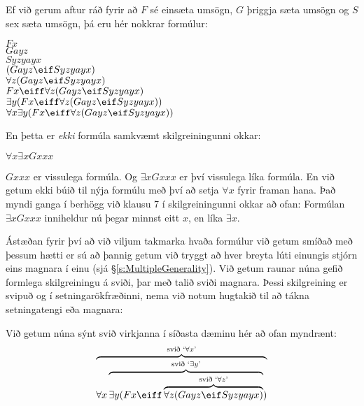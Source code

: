 Ef við gerum aftur ráð fyrir að $F$ sé einsæta umsögn, $G$ þriggja sæta umsögn og $S$ sex sæta umsögn, þá eru hér nokkrar formúlur:
	\begin{center}
		$Fx$\\
		$Gayz$\\
		$Syzyayx$\\
		$(Gayz \eif Syzyayx)$\\
		$\forall z (Gayz \eif Syzyayx)$\\
		$Fx \eiff \forall z (Gayz \eif Syzyayx)$\\
		$\exists y (Fx \eiff \forall z (Gayz \eif Syzyayx))$\\
		$\forall x \exists y (Fx \eiff \forall z (Gayz \eif Syzyayx))$		\end{center}
En þetta er \emph{ekki} formúla samkvæmt skilgreiningunni okkar:		
	\begin{center}
		$\forall x \exists x Gxxx$
	\end{center}
$Gxxx$ er vissulega formúla. Og $\exists x Gxxx$ er því vissulega líka formúla. En við getum ekki búið til nýja formúlu með því að setja $\forall x$ fyrir framan hana. Það myndi ganga í berhögg við klausu 7 í skilgreiningunni okkar að ofan: Formúlan $\exists x Gxxx$ inniheldur nú þegar minnst eitt $x$, en líka $\exists x$.
	
Ástæðan fyrir því að við viljum takmarka hvaða formúlur við getum smíðað með þessum hætti er sú að þannig getum við tryggt að hver breyta lúti einungis stjórn eins magnara í einu (sjá \S\ref{s:MultipleGenerality}). Við getum raunar núna gefið formlega skilgreiningu á sviði, þar með talið sviði magnara. Þessi skilgreining er svipuð og í setningarökfræðinni, nema við notum hugtakið  til að tákna setningatengi eða magnara:

Við getum núna sýnt svið virkjanna í síðasta dæminu hér að ofan myndrænt:
	$$\overbrace{\forall x \overbrace{\exists y (Fx \eiff \overbrace{\forall z (Gayz \eif Syzyayx)}^{\text{svið `}\forall z\text{'}}}^{\text{svið `}\exists y\text{'}})}^{\text{svið `}\forall x\text{'}}$$

